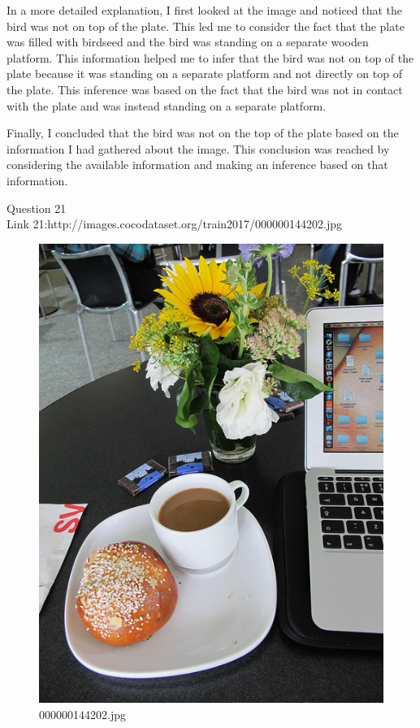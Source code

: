 \begin{enumerate}
        In a more detailed explanation, I first looked at the image and noticed that the bird was not on top of the plate. This led me to consider the fact that the plate was filled with birdseed and the bird was standing on a separate wooden platform. This information helped me to infer that the bird was not on top of the plate because it was standing on a separate platform and not directly on top of the plate. This inference was based on the fact that the bird was not in contact with the plate and was instead standing on a separate platform.
        
        Finally, I concluded that the bird was not on the top of the plate based on the information I had gathered about the image. This conclusion was reached by considering the available information and making an inference based on that information.
    \end{enumerate}
Question 21\\
Link 21:http://images.cocodataset.org/train2017/000000144202.jpg
    \begin{figure}[h]
        \centering
        \includegraphics[width=0.8\linewidth]{../image set/easy/000000144202.jpg}
        \caption{000000144202.jpg}
    \end{figure}
